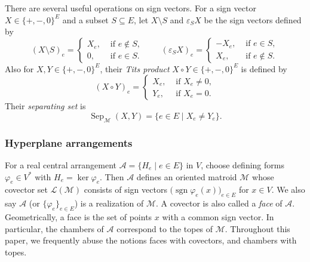 \documentclass[10pt]{amsart}
\theoremstyle{plain}
\theoremstyle{definition}
\DeclareMathOperator{\sgn}{sgn}
\newcommand{\A}{\mathcal{A}}
\newcommand{\M}{\mathcal{M}}
\newcommand{\Lcov}{\mathcal{L}}
\newcommand{\Sep}{\operatorname{Sep}}
\newcommand{\eps}{\varepsilon}
\begin{document}
There are several useful operations on sign vectors. For a sign vector $X\in\{+,-,0\}^E$ and a subset $S\subseteq E$, let $X\setminus S$ and $\eps_S X$ be the sign vectors defined by
\begin{equation}\label{backslash-reversal}
(X\setminus S)_e=\begin{cases}
    X_e, & \text{ if }e\not\in S,\\
    0, & \text{ if }e\in S.
\end{cases}
\qquad
(\eps_S X)_e=\begin{cases}
    -X_e, &\text{ if } e\in S,\\
    X_e, &\text{ if } e\not\in S.
\end{cases}
\end{equation}
Also for $X,Y\in\{+,-,0\}^E$, their \emph{Tits product} $X\circ Y\in\{+,-,0\}^E$ is defined by
\begin{equation}\label{titsproduct}
(X\circ Y)_e=\begin{cases}
X_e, & \text{ if } X_e\neq 0,\\
Y_e, & \text{ if } X_e=0.
\end{cases}
\end{equation}
Their \emph{separating set} is
\[
\Sep_{\M}(X,Y)=\{e\in E\mid X_e\neq Y_e\}.
\]

\subsubsection{Hyperplane arrangements}
For a real central arrangement $\A=\{H_e \mid e\in E\}$ in $V$, choose defining forms $\varphi_e\in V^*$ with $H_e=\ker\varphi_e$. Then $\A$ defines an oriented matroid $\M$ whose covector set $\Lcov(\M)$ consists of sign vectors $\bigl(\sgn\varphi_e(x)\bigr)_{e\in E}$ for $x\in V$. We also say $\A$ (or $\{\varphi_e\}_{e\in E}$) is a realization of $\M$. A covector is also called a \emph{face} of $\A$. Geometrically, a face is the set of points $x$ with a common sign vector. In particular, the chambers of $\A$ correspond to the topes of $\M$. Throughout this paper, we frequently abuse the notions faces with covectors, and chambers with topes.
\end{document}
